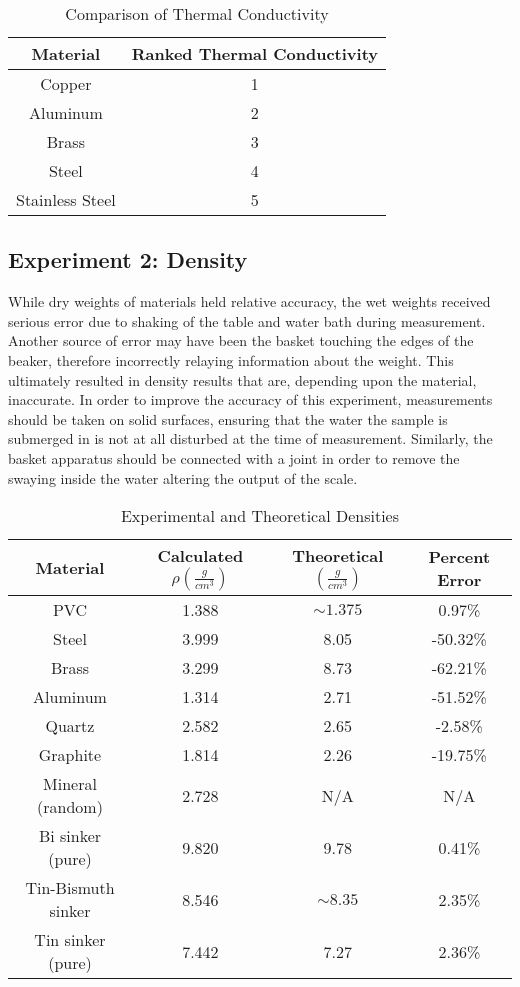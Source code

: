 \documentclass{article}
\begin{document}
{\renewcommand{\arraystretch}{1.2}
\begin{table}[H]
\begin{center}
\begin{tabular}{c|c}
Material & Ranked Thermal Conductivity \\
\hline
Copper & 1 \\
Aluminum & 2 \\
Brass & 3 \\
Steel & 4 \\
Stainless Steel & 5 \\
\end{tabular}
\caption{Comparison of Thermal Conductivity}
\end{center}
\end{table}}


\subsection{Experiment 2: Density}

While dry weights of materials held relative accuracy, the wet weights received serious error due to shaking of the table and water bath during measurement. Another source of error may have been the basket touching the edges of the beaker, therefore incorrectly relaying information about the weight. This ultimately resulted in density results that are, depending upon the material, inaccurate. In order to improve the accuracy of this experiment, measurements should be taken on solid surfaces, ensuring that the water the sample is submerged in is not at all disturbed at the time of measurement. Similarly, the basket apparatus should be connected with a joint in order to remove the swaying inside the water altering the output of the scale.   



{\renewcommand{\arraystretch}{1.2}
\begin{table}[H]
\begin{center}
\begin{tabular}{c|c|c|c}
Material & Calculated $\rho (\frac{g}{cm^3})$ & Theoretical $(\frac{g}{cm^3})$ & Percent Error\\
\hline
PVC & 1.388 & ${\sim}1.375$ & 0.97\% \\
Steel &  3.999 & 8.05 & -50.32\% \\
Brass &  3.299 & 8.73 & -62.21\% \\
Aluminum & 1.314 & 2.71 & -51.52\% \\
Quartz & 2.582 & 2.65 & -2.58\% \\
Graphite & 1.814 &  2.26 & -19.75\% \\
Mineral (random) & 2.728 & N/A & N/A \\
Bi sinker (pure) & 9.820 & 9.78 & 0.41\% \\
Tin-Bismuth sinker &  8.546 & ${\sim}8.35$ & 2.35\% \\
Tin sinker (pure) & 7.442 & 7.27 & 2.36\% \\
\end{tabular}
\caption{Experimental and Theoretical Densities}
\end{center}
\end{table}}
\end{document}
